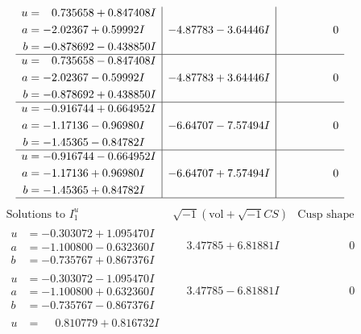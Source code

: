 \documentclass[1p]{elsarticle_modified}
\theoremstyle{definition}
\newcommand{\I}{\sqrt{-1}}
\begin{document}
$$\begin{array}{c|c|c}
\begin{aligned}
u &= \phantom{-}0.735658 + 0.847408 I \\
a &= -2.02367 + 0.59992 I \\
b &= -0.878692 - 0.438850 I\end{aligned}
 & -4.87783 - 3.64446 I & \phantom{-0.000000 } 0 \\ \hline\begin{aligned}
u &= \phantom{-}0.735658 - 0.847408 I \\
a &= -2.02367 - 0.59992 I \\
b &= -0.878692 + 0.438850 I\end{aligned}
 & -4.87783 + 3.64446 I & \phantom{-0.000000 } 0 \\ \hline\begin{aligned}
u &= -0.916744 + 0.664952 I \\
a &= -1.17136 - 0.96980 I \\
b &= -1.45365 - 0.84782 I\end{aligned}
 & -6.64707 - 7.57494 I & \phantom{-0.000000 } 0 \\ \hline\begin{aligned}
u &= -0.916744 - 0.664952 I \\
a &= -1.17136 + 0.96980 I \\
b &= -1.45365 + 0.84782 I\end{aligned}
 & -6.64707 + 7.57494 I & \phantom{-0.000000 } 0\\
 \hline 
 \end{array}$$\newpage$$\begin{array}{c|c|c}  
\text{Solutions to }I^u_{1}& \I (\text{vol} + \sqrt{-1}CS) & \text{Cusp shape}\\
 \hline 
\begin{aligned}
u &= -0.303072 + 1.095470 I \\
a &= -1.100800 - 0.632360 I \\
b &= -0.735767 + 0.867376 I\end{aligned}
 & \phantom{-}3.47785 + 6.81881 I & \phantom{-0.000000 } 0 \\ \hline\begin{aligned}
u &= -0.303072 - 1.095470 I \\
a &= -1.100800 + 0.632360 I \\
b &= -0.735767 - 0.867376 I\end{aligned}
 & \phantom{-}3.47785 - 6.81881 I & \phantom{-0.000000 } 0 \\ \hline\begin{aligned}
u &= \phantom{-}0.810779 + 0.816732 I \\

\end{aligned}
\end{array}$$
\end{document}
